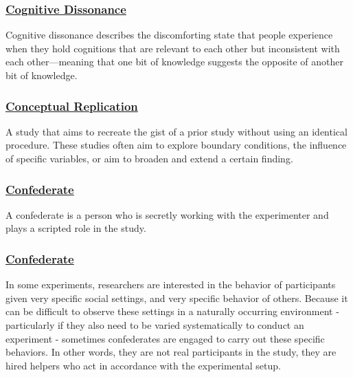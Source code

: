 \documentclass[
  letterpaper,
]{book}
\begin{document}
\subsubsection*{\texorpdfstring{\hyperref[def-cognitivedissonance]{Cognitive
Dissonance}}{Cognitive Dissonance}}\label{cognitive-dissonance-1}

Cognitive dissonance describes the discomforting state that people
experience when they hold cognitions that are relevant to each other but
inconsistent with each other---meaning that one bit of knowledge
suggests the opposite of another bit of knowledge.

\subsubsection*{\texorpdfstring{\hyperref[def-conceptualreplication]{Conceptual
Replication}}{Conceptual Replication}}\label{conceptual-replication}

A study that aims to recreate the gist of a prior study without using an
identical procedure. These studies often aim to explore boundary
conditions, the influence of specific variables, or aim to broaden and
extend a certain finding.

\subsubsection*{\texorpdfstring{\hyperref[def-confederate]{Confederate}}{Confederate}}\label{confederate}

A confederate is a person who is secretly working with the experimenter
and plays a scripted role in the study.

\subsubsection*{\texorpdfstring{\hyperref[def-confederate]{Confederate}}{Confederate}}\label{confederate-1}

In some experiments, researchers are interested in the behavior of
participants given very specific social settings, and very specific
behavior of others. Because it can be difficult to observe these
settings in a naturally occurring environment - particularly if they
also need to be varied systematically to conduct an experiment -
sometimes confederates are engaged to carry out these specific
behaviors. In other words, they are not real participants in the study,
they are hired helpers who act in accordance with the experimental
setup.
\end{document}
